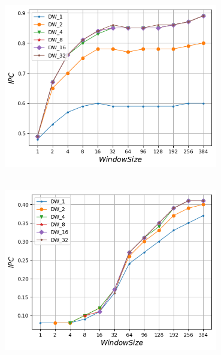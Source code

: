 \vspace{3mm}
   \begin{minipage}{\textwidth}
      \begin{center}
         \\
         \vspace{3mm}
         \includegraphics[width=0.7\textwidth, frame]{./graphs/ipc/gcc.png}
         \vspace{6mm}
      \end{center}
   \end{minipage}

   \begin{minipage}{\textwidth}
      \begin{center}
         \\
         \vspace{3mm}
         \includegraphics[width=0.7\textwidth, frame]{./graphs/ipc/mcf.png}
         \vspace{6mm}
      \end{center}
   \end{minipage}


